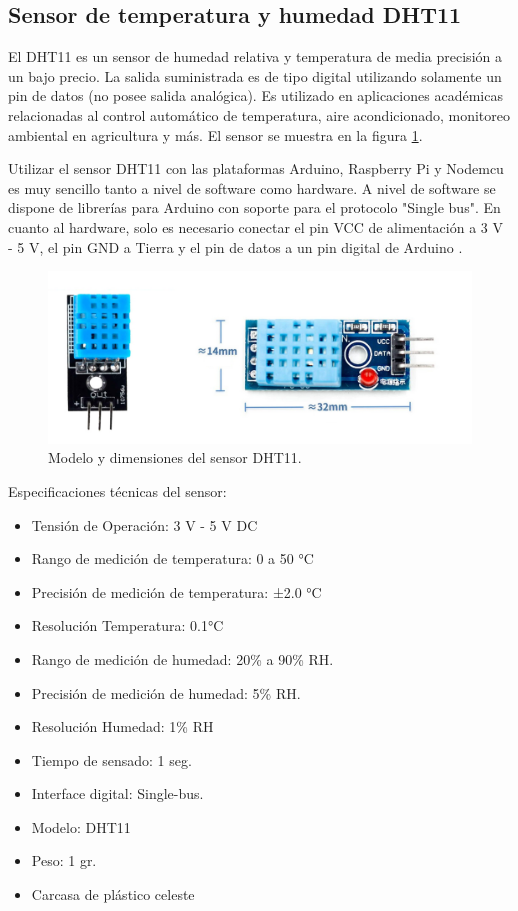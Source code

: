 \subsection{Sensor de temperatura y humedad DHT11}

El DHT11 es un sensor de humedad relativa y temperatura de media precisión a un bajo precio. La salida suministrada es de tipo digital utilizando solamente un pin de datos (no posee salida analógica). Es utilizado en aplicaciones académicas relacionadas al control automático de temperatura, aire acondicionado, monitoreo ambiental en agricultura y más. El sensor se muestra en la figura \ref{fig:dht11}.

Utilizar el sensor DHT11 con las plataformas Arduino, Raspberry Pi y Nodemcu es muy sencillo tanto a nivel de software como hardware. A nivel de software se dispone de librerías para Arduino con soporte para el protocolo "Single bus". En cuanto al hardware, solo es necesario conectar el pin VCC de alimentación a 3 V - 5 V, el pin GND a Tierra y el pin de datos a un pin digital de Arduino \citep{WEBSITE:8}. 

\begin{figure}[htbp]
	\centering
	\includegraphics[width=.8\textwidth]{./Figures/dht11.jpg}
	\caption{Modelo y dimensiones del sensor DHT11. }

	\label{fig:dht11}
\end{figure}

Especificaciones técnicas del sensor:

\begin{itemize}
\item Tensión de Operación: 3 V - 5 V DC
\item Rango de medición de temperatura: 0 a 50 °C
\item Precisión de medición de temperatura: ±2.0 °C
\item Resolución Temperatura: 0.1°C
\item Rango de medición de humedad: 20\% a 90\% RH.
\item Precisión de medición de humedad: 5\% RH.
\item Resolución Humedad: 1\% RH
\item Tiempo de sensado: 1 seg.
\item Interface digital: Single-bus.
\item Modelo: DHT11
\item Peso: 1 gr.
\item Carcasa de plástico celeste
\end{itemize}

